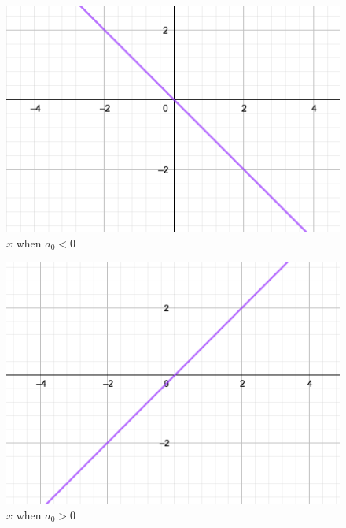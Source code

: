 \documentclass{beamer}
\begin{document}
    \begin{frame}
        \begin{example}
            \begin{figure}
                \caption{$x$ when $a_0 < 0$}
                \includegraphics[scale=0.3]{images/x-nega.png}
            \end{figure}
        \end{example}
    \end{frame}
    \begin{frame}
        \begin{example}
            \begin{figure}
                \caption{$x$ when $a_0 > 0$}
                \includegraphics[scale=0.3]{images/x-posi.png}
            \end{figure}
        \end{example}
    \end{frame}
\end{document}
